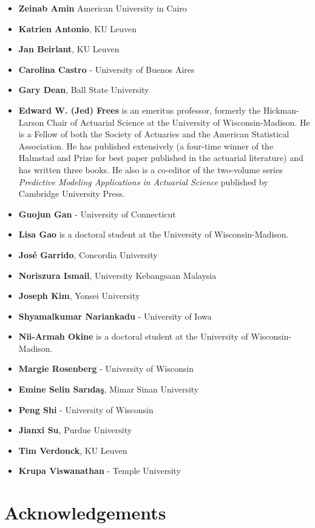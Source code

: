 \documentclass[]{book}
\theoremstyle{definition}
\theoremstyle{definition}
\theoremstyle{definition}
\theoremstyle{remark}
\begin{document}
\begin{itemize}
\item
  \textbf{Zeinab Amin} American University in Cairo
\item
  \textbf{Katrien Antonio}, KU Leuven
\item
  \textbf{Jan Beirlant}, KU Leuven
\item
  \textbf{Carolina Castro} - University of Buenos Aires
\item
  \textbf{Gary Dean}, Ball State University
\item
  \textbf{Edward W. (Jed) Frees} is an emeritus professor, formerly the
  Hickman-Larson Chair of Actuarial Science at the University of
  Wisconsin-Madison. He is a Fellow of both the Society of Actuaries and
  the American Statistical Association. He has published extensively (a
  four-time winner of the Halmstad and Prize for best paper published in
  the actuarial literature) and has written three books. He also is a
  co-editor of the two-volume series \emph{Predictive Modeling
  Applications in Actuarial Science} published by Cambridge University
  Press.
\item
  \textbf{Guojun Gan} - University of Connecticut
\item
  \textbf{Lisa Gao} is a doctoral student at the University of
  Wisconsin-Madison.
\item
  \textbf{José Garrido}, Concordia University
\item
  \textbf{Noriszura Ismail}, University Kebangsaan Malaysia
\item
  \textbf{Joseph Kim}, Yonsei University
\item
  \textbf{Shyamalkumar Nariankadu} - University of Iowa
\item
  \textbf{Nii-Armah Okine} is a doctoral student at the University of
  Wisconsin-Madison.
\item
  \textbf{Margie Rosenberg} - University of Wisconsin
\item
  \textbf{Emine Selin Sarıdaş}, Mimar Sinan University
\item
  \textbf{Peng Shi} - University of Wisconsin
\item
  \textbf{Jianxi Su}, Purdue University
\item
  \textbf{Tim Verdonck}, KU Leuven
\item
  \textbf{Krupa Viswanathan} - Temple University
\end{itemize}

\chapter*{Acknowledgements}\label{acknowledgements}
\end{document}
